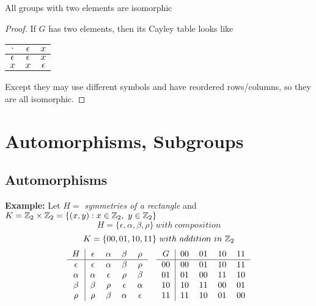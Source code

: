 \documentclass[openany]{report}
\begin{document}
\begin{prop}
    All groups with two elements are isomorphic
\end{prop}
\begin{proof}
    If $G$ has two elements, then its Cayley table looks like 
    \begin{center}
         \begin{tabular}{c|cc}
        $\cdot$ & $\epsilon$ & $x$ \\
        \hline
        $\epsilon$ & $\epsilon$ & $x$\\
        $x$ & $x$ & $\epsilon$
    \end{tabular}   
    \end{center}
    Except they may use different symbols and have reordered rows/columns, so they are all isomorphic.
\end{proof}

\chapter{Automorphisms, Subgroups}
\section{Automorphisms}
\textbf{Example:}
Let $H = $ \textit{symmetries of a rectangle} and $K = \mathbb{Z}_2 \times \mathbb{Z}_2 = \{(x,y): x\in \mathbb{Z}_2, \ y\in\mathbb{Z}_2\}$
$$H = \{\epsilon, \alpha, \beta, \rho\} \ with \ composition$$
$$K = \{00, 01, 10,11\} \ with \ addition \ in \ \ints_2$$
\begin{align*}
\begin{tabular}{c|cccc}
     $H$& $\epsilon$ & $\alpha$ & $\beta$ &$\rho$  \\
     \hline
     $\epsilon$ & $\epsilon$ & $\alpha$ & $\beta$ & $\rho$\\
     $\alpha$ & $\alpha$ & $\epsilon$ & $\rho$ & $\beta $\\
     $\beta$ & $\beta$ & $\rho$ & $\epsilon$ & $\alpha$\\
     $\rho$ & $\rho$ & $\beta$ & $\alpha$ & $\epsilon$  
\end{tabular}&&
\begin{tabular}{c|cccc}
     $G$& $00$ & $01$ & $10$ &$11$  \\
     \hline
     $00$ & $00$ & $01$ & $10$ & $11$\\
     $01$ & $01$ & $00$ & $11$ & $10 $\\
     $10$ & $10$ & $11$ & $00$ & $01$\\
     $11$ & $11$ & $10$ & $01$ & $00$  
\end{tabular}\\
\end{align*}
\end{document}
